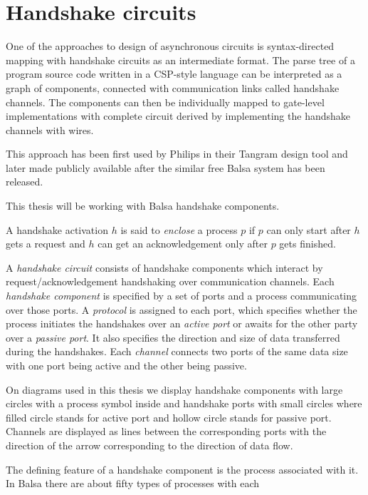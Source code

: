 
\section{Handshake circuits}


One of the approaches to design of asynchronous circuits is syntax-directed mapping with 
handshake circuits as an intermediate format. The parse tree of a program source code written in 
a CSP-style \cite{csp} language can be interpreted as a graph of components, connected with communication links
called handshake channels. The components can then be individually mapped to gate-level implementations
with complete circuit derived by implementing the handshake channels with wires.

This approach has been first used by Philips in their Tangram \cite{tangram} design tool
and later made publicly available after the similar free Balsa \cite{balsa} system has been released.

This thesis will be working with Balsa handshake components.

A handshake activation $h$ is said to \emph{enclose} a process $p$ if $p$ can only start after $h$ gets a request and $h$ can get an acknowledgement only after $p$ gets finished.

A \emph{handshake circuit} consists of handshake components which interact by request/acknowledgement handshaking 
over communication channels.
Each \emph{handshake component} is specified by a set of ports and a process communicating over those ports.
A \emph{protocol} is assigned to each port, which specifies whether the process initiates the handshakes
over an \emph{active port} or awaits for the other party over a \emph{passive port}. 
It also specifies the direction and size of data transferred during the handshakes.
Each \emph{channel} connects two ports of the same data size with one port being active and the other being passive.

On diagrams used in this thesis we display handshake components with large circles with a process symbol inside
and handshake ports with small circles where filled circle stands for active port and hollow circle stands for passive port.
Channels are displayed as lines between the corresponding ports with the direction of the arrow corresponding to the
direction of data flow.


The defining feature of a handshake component is the process associated with it. 
In Balsa there are about fifty types of processes with each 


